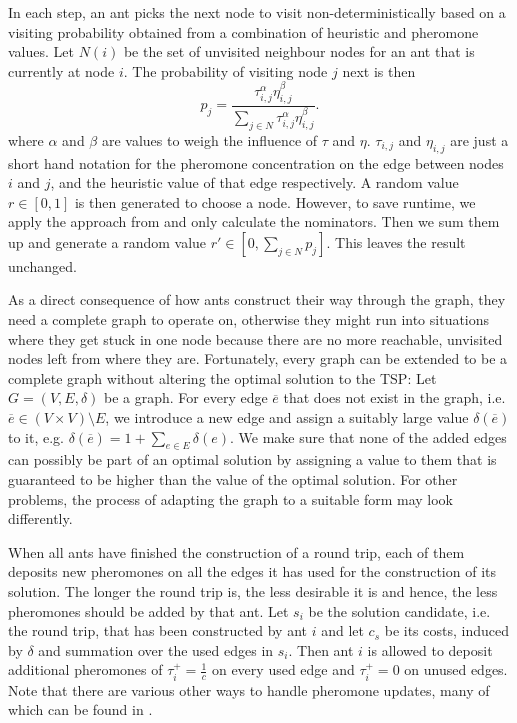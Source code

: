 In each step, an ant picks the next node to visit non-deterministically based on a visiting probability obtained from a combination of heuristic and pheromone values. Let $N \left( i \right)$ be the set of unvisited neighbour nodes for an ant that is currently at node $i$. The probability of visiting node $j$ next is then
\begin{equation}
  \label{eqn:probability}
  p_j = \frac{\tau_{i,j}^\alpha \eta_{i,j}^\beta}{\sum_{j \in N} \tau_{i,j}^\alpha \eta_{i,j}^\beta}.
\end{equation}
where $\alpha$ and $\beta$ are values to weigh the influence of $\tau$ and $\eta$. $\tau_{i,j}$ and $\eta_{i,j}$ are just a short hand notation for the pheromone concentration on the edge between nodes $i$ and $j$, and the heuristic value of that edge respectively. A random value $r \in \left[0, 1 \right]$ is then generated to choose a node. However, to save runtime, we apply the approach from \cite{Bloecker} and only calculate the nominators. Then we sum them up and generate a random value $r' \in \left[0, \sum_{j \in N} p_j \right]$. This leaves the result unchanged.

As a direct consequence of how ants construct their way through the graph, they need a complete graph to operate on, otherwise they might run into situations where they get stuck in one node because there are no more reachable, unvisited nodes left from where they are. Fortunately, every graph can be extended to be a complete graph without altering the optimal solution to the \textsc{TSP}: Let $G = \left( V, E, \delta \right)$ be a graph. For every edge $\overline{e}$ that does not exist in the graph, i.e. $\overline{e} \in \left( V \times V \right) \setminus E$, we introduce a new edge and assign a suitably large value $\delta \left( \overline{e} \right)$ to it, e.g. $\delta \left( \overline{e} \right) = 1 + \sum_{e \in E} \delta \left( e \right)$. We make sure that none of the added edges can possibly be part of an optimal solution by assigning a value to them that is guaranteed to be higher than the value of the optimal solution. For other problems, the process of adapting the graph to a suitable form may look differently.

When all ants have finished the construction of a round trip, each of them deposits new pheromones on all the edges it has used for the construction of its solution. The longer the round trip is, the less desirable it is and hence, the less pheromones should be added by that ant. Let $s_i$ be the solution candidate, i.e. the round trip, that has been constructed by ant $i$ and let $c_s$ be its costs, induced by $\delta$ and summation over the used edges in $s_i$. Then ant $i$ is allowed to deposit additional pheromones of $\tau_i^+ = \frac{1}{c}$ on every used edge and $\tau_i^+ = 0$ on unused edges. Note that there are various other ways to handle pheromone updates, many of which can be found in \cite{Dorigo:2004:ACO:975277}.

